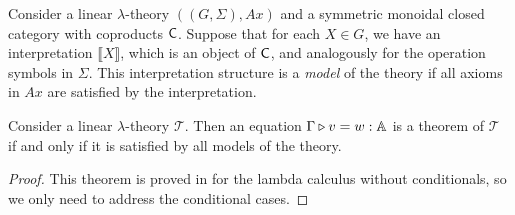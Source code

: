 \begin{definition} 
Consider a linear \(\lambda\)-theory \(((G, \Sigma), Ax)\) and a symmetric monoidal closed category with coproducts \(\mathsf{C}\). 
Suppose that for each \(X \in G\), we have an interpretation \(\llbracket X \rrbracket\), which is an object of \(\mathsf{C}\), 
and analogously for the operation symbols in \(\Sigma\). 
This interpretation structure is a \emph{model} of the theory if all axioms in \(Ax\) are satisfied by the interpretation.
\end{definition}

\begin{theorem}[Completeness] \label{thm:completeness_classical}
Consider a linear $\lambda$-theory $\mathscr{T}$. Then an equation 
$\Gamma \triangleright v = w : \mathbb{A}$
is a theorem of $\mathscr{T}$ if and only if it is satisfied by all models of the theory.
\end{theorem}

 \begin{proof}
   This theorem is proved in \cite[Lemma 2.6]{dahlqvist2023syntactic} for the lambda calculus without conditionals, so we only need to address the conditional cases.
 \end{proof}


